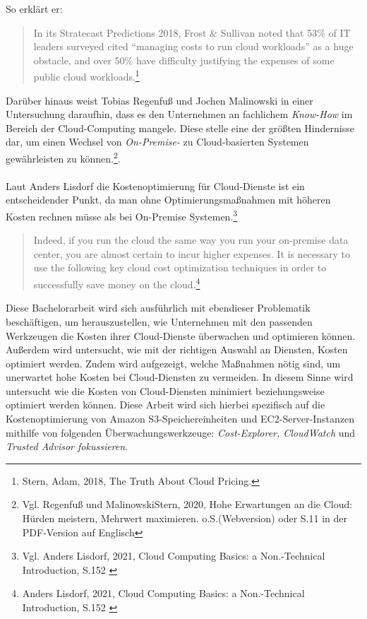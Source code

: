 So erklärt er: \\
\begin{quote}    
    In its Stratecast Predictions 2018, Frost \& Sullivan noted that 53\% of IT leaders surveyed cited “managing costs to run cloud workloads” as a huge obstacle, and over 50\% have difficulty justifying the expenses of some public cloud workloads.\footnote{Stern, Adam, 2018, The Truth About Cloud Pricing.\cite{SP1}}
\end{quote}
Darüber hinaus weist Tobias Regenfuß und Jochen Malinowski in einer Untersuchung daraufhin, dass es den Unternehmen an fachlichem \textit{Know-How} im Bereich der Cloud-Computing mangele. Diese stelle eine der größten Hindernisse dar, um einen Wechsel von \textit{On-Premise-} zu Cloud-basierten Systemen gewährleisten zu können.\footnote{Vgl. Regenfuß und MalinowskiStern, 2020, Hohe Erwartungen an die Cloud: Hürden meistern, Mehrwert maximieren. o.S.(Webversion) oder S.11 in der PDF-Version auf Englisch\cite{ACC1}}.
\\\\
Laut Anders Lisdorf die Kostenoptimierung für Cloud-Dienste ist ein entscheidender Punkt, da man ohne Optimierungsmaßnahmen mit höheren Kosten rechnen müsse als bei On-Premise Systemen.\footnote{Vgl. Anders Lisdorf, 2021, Cloud Computing Basics: a Non.-Technical Introduction, S.152 \cite{CCB}}
\\
\begin{quote}
    Indeed, if you run the cloud the same way you run your on-premise data center, you are almost certain to incur higher expenses. It is necessary to use the following key cloud cost optimization techniques in order to successfully save money on the cloud.\footnote{Anders Lisdorf, 2021, Cloud Computing Basics: a Non.-Technical Introduction, S.152 \cite{CCB}}
\end{quote}
\begin{flushleft}
Diese Bachelorarbeit wird sich ausführlich mit ebendieser Problematik beschäftigen, um herauszustellen, wie Unternehmen mit den passenden Werkzeugen die Kosten ihrer Cloud-Dienste überwachen und optimieren können. %
Außerdem wird untersucht, wie mit der richtigen Auswahl an Diensten, Kosten optimiert werden. 
Zudem wird aufgezeigt, welche Maßnahmen nötig sind, um unerwartet hohe Kosten bei Cloud-Diensten zu vermeiden. In diesem Sinne wird untersucht %
wie die Kosten von Cloud-Diensten minimiert beziehungsweise optimiert werden können. Diese Arbeit wird sich hierbei spezifisch auf die Kostenoptimierung  von Amazon S3-Speichereinheiten und EC2-Server-Instanzen mithilfe von folgenden Überwachungswerkzeuge: \textit{Cost-Explorer, CloudWatch} und \textit{Trusted Advisor fokussieren}.
\end{flushleft}

